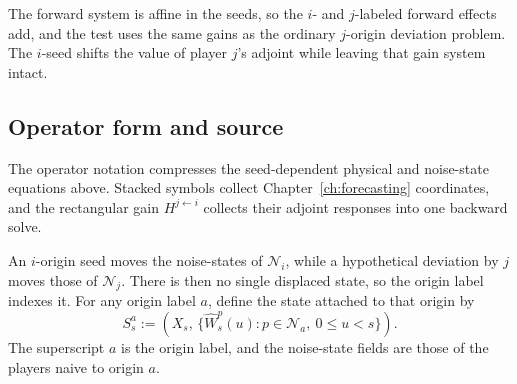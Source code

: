 \begin{remark}\label{rem:fixed_kernel}
The forward system is affine in the seeds, so the $i$- and $j$-labeled forward effects add, and the test uses the same gains as the ordinary $j$-origin deviation problem.  The $i$-seed shifts the value of player $j$'s adjoint while leaving that gain system intact.
\end{remark}

\subsection{Operator form and source}
\label{sec:filtered_operator}


The operator notation compresses the seed-dependent physical and noise-state equations above.  Stacked symbols collect Chapter~\ref{ch:forecasting} coordinates, and the rectangular gain $H^{j\leftarrow i}$ collects their adjoint responses into one backward solve.

An $i$-origin seed moves the noise-states of $\mathcal N_i$, while a hypothetical deviation by $j$ moves those of $\mathcal N_j$.  There is then no single displaced state, so the origin label indexes it.  For any origin label $a$, define the state attached to that origin by
\begin{equation}\label{eq:filtered_state_Sa}
    S^a_s
    :=
    \left(
        X_s,\,
        \{\widehat W^p_s(u):p\in \mathcal N_a,\ 0\le u<s\}
    \right).
\end{equation}
The superscript $a$ is the origin label, and the noise-state fields are those of the players naive to origin $a$.

